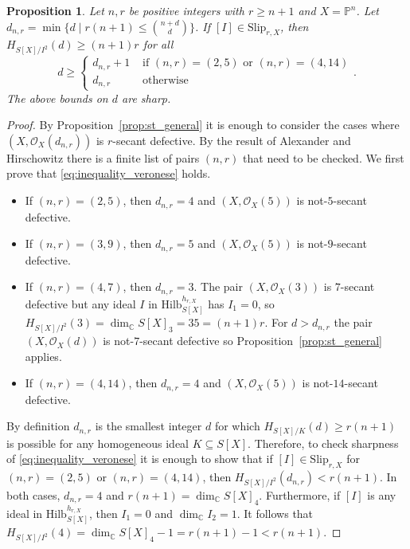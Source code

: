 \documentclass[12pt]{amsart}
\newtheorem{proposition}[theorem]{Proposition}
\theoremstyle{definition}
\theoremstyle{remark}
\theoremstyle{definition}
\newcommand{\HF}[2]{H_{#1}(#2)}
\newcommand{\Slip}[2]{\mathrm{Slip}_{#1,#2}}
\newcommand{\CC}{\mathbb{C}}
\newcommand{\OO}{\mathcal{O}}
\newcommand{\PP}{\mathbb{P}}
\newcommand{\Hilb}{\mathrm{Hilb}}
\begin{document}
\begin{proposition}\label{prop:st_veronese}
    Let $n, r$ be positive integers with $r\geq n+1$ and $X= \PP^n$. Let $d_{n,r} = \min\{d \mid r(n+1) \leq \binom{n+d}{d}\}$.    
    If $[I]\in \Slip{r}{X}$, then $\HF{S[X]/I^2}{d} \geq (n+1)r$ for all 
    \begin{equation}\label{eq:inequality_veronese}
    d \geq \begin{cases} d_{n,r} + 1& \text{ if } (n,r) = (2,5) \text{ or } (n,r) =(4,14) \\ d_{n,r} & \text{ otherwise}\end{cases}.    
    \end{equation}
    The above bounds on $d$ are sharp.
    \end{proposition}
\begin{proof}
   By Proposition~\ref{prop:st_general} it is enough to consider the cases where $(X, \OO_{X}(d_{n,r}))$ is $r$-secant defective.
   By the result of Alexander and Hirschowitz \cite{AH95} there is a finite list of pairs $(n,r)$ that need to be checked. We first prove that \eqref{eq:inequality_veronese} holds.
   \begin{itemize}
       \item If $(n,r) = (2,5)$, then $d_{n,r} = 4$ and $(X, \OO_X(5))$ is not-$5$-secant defective.
       \item If $(n,r) = (3,9)$, then $d_{n,r} = 5$ and $(X, \OO_X(5))$ is not-$9$-secant defective.
       \item If $(n,r) = (4,7)$, then $d_{n,r} = 3$. The pair $(X, \OO_X(3))$ is $7$-secant defective but any ideal $I$ in $\Hilb_{S[X]}^{h_{r,X}}$ has $I_1 = 0$, so $\HF{S[X]/I^2}{3} = \dim_\CC S[X]_3 = 35 = (n+1)r$. For $d>d_{n,r}$ the pair $(X, \OO_X(d))$ is not-$7$-secant defective so Proposition~\ref{prop:st_general} applies.
       \item If $(n,r) = (4,14)$, then $d_{n,r} = 4$ and $(X, \OO_X(5))$ is not-$14$-secant defective.
   \end{itemize}
   By definition $d_{n,r}$ is the smallest integer $d$ for which $\HF{S[X]/K}{d} \ge r(n+1)$ is possible for any homogeneous ideal $K\subseteq S[X]$. Therefore, to check sharpness of \eqref{eq:inequality_veronese} it is enough to show that if $[I]\in \Slip{r}{X}$ for $(n,r) = (2,5)$ or $(n,r) = (4,14)$, then $\HF{S[X]/I^2}{d_{n,r}} < r(n+1)$. In both cases, $d_{n,r} = 4$ and $r(n+1) = \dim_\CC S[X]_4$. Furthermore, if $[I]$ is any ideal in $\Hilb_{S[X]}^{h_{r,X}}$, then $I_1 = 0$ and $\dim_\CC I_2 = 1$. It follows that $\HF{S[X]/I^2}{4} = \dim_\CC S[X]_4 - 1 = r(n+1) - 1 < r(n+1)$.
\end{proof}
\end{document}
